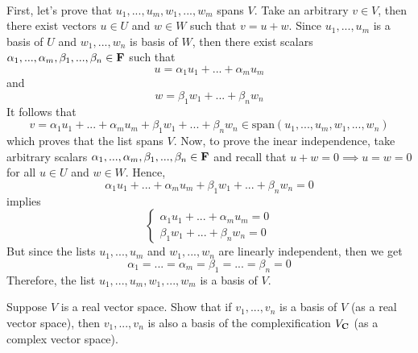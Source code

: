 \begin{solution}
    \\ First, let's prove that $u_1, ..., u_m, w_1, ..., w_m$ spans $V$. Take an arbitrary $v \in V$, then there exist vectors $u \in U$ and $w \in W$ such that $v = u+w$. Since $u_1, ..., u_m$ is a basis of $U$ and $w_1, ..., w_n$ is basis of $W$, then there exist scalars $\alpha_1, ..., \alpha_m, \beta_1, ..., \beta_n \in \mathbf{F}$ such that
    $$u = \alpha_1 u_1 + ... + \alpha_m u_m$$
    and
    $$w = \beta_1 w_1 + ... + \beta_n w_n$$
    It follows that
    $$v = \alpha_1 u_1 + ... + \alpha_m u_m + \beta_1 w_1 + ... + \beta_n w_n \in \text{span}(u_1, ..., u_m, w_1, ..., w_n)$$
    which proves that the list spans $V$. Now, to prove the inear independence, take arbitrary scalars $\alpha_1, ..., \alpha_m, \beta_1, ..., \beta_n \in \mathbf{F}$ and recall that $u + w = 0 \implies u = w = 0$ for all $u \in U$ and $w \in W$. Hence,
    $$\alpha_1 u_1 + ... + \alpha_m u_m + \beta_1 w_1 + ... + \beta_n w_n = 0 $$
    implies
    $$\begin{cases}
        \alpha_1 u_1 + ... + \alpha_m u_m = 0 \\ \beta_1 w_1 + ... + \beta_n w_n = 0
    \end{cases}$$
    But since the lists $u_1, ..., u_m$ and $w_1, ..., w_n$ are linearly independent, then we get 
    $$\alpha_1 = ... = \alpha_m = \beta_1 = ... = \beta_n = 0$$
    Therefore, the list $u_1, ..., u_m, w_1, ..., w_m$ is a basis of $V$. \\
\end{solution}

\begin{exercise}
    Suppose $V$ is a real vector space. Show that if $v_1, ..., v_n$ is a basis of $V$ (as a real vector space), then $v_1, ..., v_n$ is also a basis of the complexification $V_{\mathbf{C}}$ (as a complex vector space). \\
\end{exercise}


